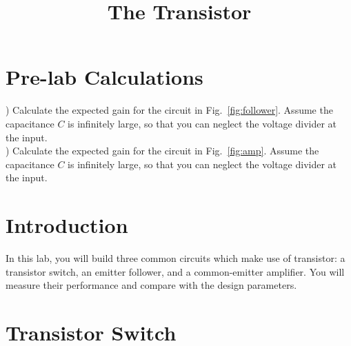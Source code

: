 \documentclass[12pt]{article}
\begin{document}

\title{The Transistor}

\maketitle

\section{Pre-lab Calculations}
) Calculate the expected gain for the circuit in Fig.~\ref{fig:follower}.   Assume the capacitance $C$ is infinitely large, so that you can neglect the voltage divider at the input.\\

) Calculate the expected gain for the circuit in Fig.~\ref{fig:amp}.  Assume the capacitance $C$ is infinitely large, so that you can neglect the voltage divider at the input.

\section{Introduction}

In this lab, you will build three common circuits which make use of transistor:  a transistor switch, an emitter follower, and a common-emitter amplifier.  You will measure their performance and compare with the design parameters.

\section{Transistor Switch}
\end{document}
